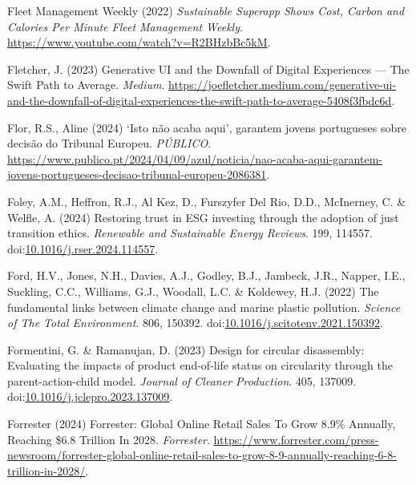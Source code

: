 \documentclass[
  letterpaper,
  DIV=11,
  numbers=noendperiod]{scrartcl}
\newlength{\cslhangindent}
\newenvironment{CSLReferences}[2] %
 {\begin{list}{}{%
  \setlength{\itemindent}{0pt}
  \setlength{\leftmargin}{0pt}
  \setlength{\parsep}{0pt}
  \ifodd #1
   \setlength{\leftmargin}{\cslhangindent}
   \setlength{\itemindent}{-1\cslhangindent}
  \fi
  \setlength{\itemsep}{#2\baselineskip}}}
 {\end{list}}
\begin{document}
\begin{CSLReferences}{0}{1}
Fleet Management Weekly (2022) \emph{Sustainable {Superapp Shows Cost},
{Carbon} and {Calories Per Minute} {\textbar} {Fleet Management
Weekly}}. \url{https://www.youtube.com/watch?v=R2BHzbBc5kM}.

Fletcher, J. (2023) Generative {UI} and the {Downfall} of {Digital
Experiences} --- {The Swift Path} to {Average}. \emph{Medium}.
\url{https://joefletcher.medium.com/generative-ui-and-the-downfall-of-digital-experiences-the-swift-path-to-average-5408f3fbdc6d}.

Flor, R.S., Aline (2024) {{`Isto n{ã}o acaba aqui'}, garantem jovens
portugueses sobre decis{ã}o do Tribunal Europeu}. \emph{P{Ú}BLICO}.
\url{https://www.publico.pt/2024/04/09/azul/noticia/nao-acaba-aqui-garantem-jovens-portugueses-decisao-tribunal-europeu-2086381}.

Foley, A.M., Heffron, R.J., Al Kez, D., Furszyfer Del Rio, D.D.,
McInerney, C. \& Welfle, A. (2024) Restoring trust in {ESG} investing
through the adoption of just transition ethics. \emph{Renewable and
Sustainable Energy Reviews}. 199, 114557.
doi:\href{https://doi.org/10.1016/j.rser.2024.114557}{10.1016/j.rser.2024.114557}.

Ford, H.V., Jones, N.H., Davies, A.J., Godley, B.J., Jambeck, J.R.,
Napper, I.E., Suckling, C.C., Williams, G.J., Woodall, L.C. \& Koldewey,
H.J. (2022) The fundamental links between climate change and marine
plastic pollution. \emph{Science of The Total Environment}. 806, 150392.
doi:\href{https://doi.org/10.1016/j.scitotenv.2021.150392}{10.1016/j.scitotenv.2021.150392}.

Formentini, G. \& Ramanujan, D. (2023) Design for circular disassembly:
{Evaluating} the impacts of product end-of-life status on circularity
through the parent-action-child model. \emph{Journal of Cleaner
Production}. 405, 137009.
doi:\href{https://doi.org/10.1016/j.jclepro.2023.137009}{10.1016/j.jclepro.2023.137009}.

Forrester (2024) Forrester: {Global Online Retail Sales To Grow} 8.9\%
{Annually}, {Reaching} \$6.8 {Trillion In} 2028. \emph{Forrester}.
\url{https://www.forrester.com/press-newsroom/forrester-global-online-retail-sales-to-grow-8-9-annually-reaching-6-8-trillion-in-2028/}.


\end{CSLReferences}
\end{document}
